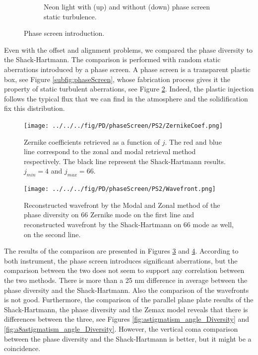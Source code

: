 \begin{figure}
\begin{subfigure}{0.45\textwidth}
        \caption{Neon light with (up) and without (down) phase screen static turbulence.}
        \label{subfig:StaticTurbulenceEx}
    \end{subfigure}
    \decoRule
    \caption{Phase screen introduction.}
\end{figure}

Even with the offset and alignment problems, we compared the phase diversity to the Shack-Hartmann. The comparison is performed with random static aberrations introduced by a phase screen. A phase screen is a transparent plastic box, see Figure \ref{subfig:phaseScreen}, whose fabrication process gives it the property of static turbulent aberrations, see Figure \ref{subfig:StaticTurbulenceEx}. Indeed, the plastic injection follows the typical flux that we can find in the atmosphere and the solidification fix this distribution.

\begin{figure}
\begin{center}
\texttt{[image: ../../../fig/PD/phaseScreen/PS2/ZernikeCoef.png]}
\decoRule
\caption{Zernike coefficients retrieved as a function of $j$. The red and blue line correspond to the zonal and modal retrieval method respectively. The black line represent the Shack-Hartmann results. $j_{min}=4$ and $j_{max}=66$. }
\label{fig:ZernikeCoef}
\end{center}
\end{figure}

\begin{figure}
\begin{center}
\texttt{[image: ../../../fig/PD/phaseScreen/PS2/Wavefront.png]}
\decoRule
\caption{Reconstructed wavefront by the Modal and Zonal method of the phase diversity on 66 Zernike mode on the first line and reconstructed wavefront by the Shack-Hartmann on 66 mode as well, on the second line.}
\label{fig:Wavefront}
\end{center}
\end{figure}

The results of the comparison are presented in Figures \ref{fig:ZernikeCoef} and \ref{fig:Wavefront}. According to both instrument, the phase screen introduces significant aberrations, but the comparison between the two does not seem to support any correlation between the two methods. There is more than a 25 nm difference in average between the phase diversity and the Shack-Hartmann. Also the comparison of the wavefronts is not good. Furthermore, the comparison of the parallel plane plate results of the Shack-Hartmann, the phase diversity and the Zemax model reveals that there is differences between the three, see Figures \ref{fig:astigmatism_angle_Diversity} and \ref{fig:a8astigmatism_angle_Diversity}. However, the vertical coma comparison between the phase diversity and the Shack-Hartmann is better, but it might be a coincidence.

